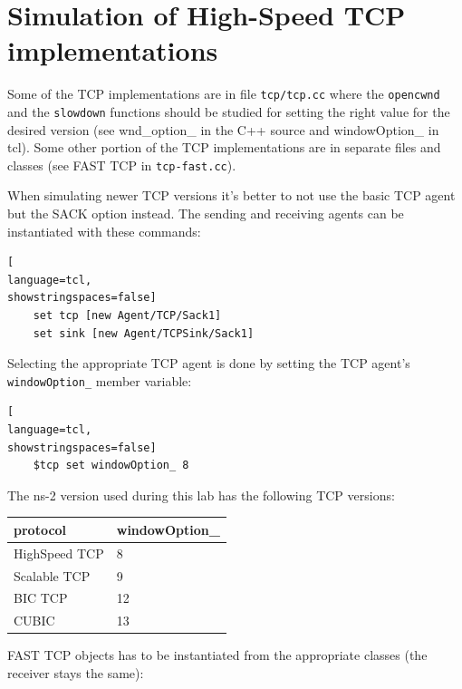 \documentclass[a4paper]{article}
\begin{document}
\section{Simulation of High-Speed TCP implementations}

Some of the TCP implementations are in file \verb!tcp/tcp.cc! where the \verb!opencwnd! and the
\verb!slowdown! functions should be studied for setting the right value for the desired version (see
wnd\_option\_ in the C++ source and windowOption\_ in tcl).
Some other portion of the TCP implementations are in separate files and classes (see FAST TCP in
\verb!tcp-fast.cc!).

When simulating newer TCP versions it's better to not use the basic TCP agent but the SACK option instead. The sending
and receiving agents can be instantiated with these commands:

\begin{lstlisting}[
language=tcl,
showstringspaces=false]
    set tcp [new Agent/TCP/Sack1]
    set sink [new Agent/TCPSink/Sack1]
\end{lstlisting}

Selecting the appropriate TCP agent is done by setting the TCP agent's \verb!windowOption_! member variable:

\begin{lstlisting}[
language=tcl,
showstringspaces=false]
    $tcp set windowOption_ 8
\end{lstlisting}

The ns-2 version used during this lab has the following TCP versions:

\begin{tabular}{|l|l|}
    \hline
    \cellcolor{blue!25} \textbf{protocol} & \cellcolor{blue!25} \textbf{windowOption\_}  \\\hline
    HighSpeed TCP                         & 8                                            \\\hline
    Scalable TCP                          & 9                                            \\\hline
    BIC TCP                               & 12                                           \\\hline
    CUBIC                                 & 13                                           \\\hline
\end{tabular}

\hfill \break
FAST TCP objects has to be instantiated from the appropriate classes (the receiver stays the same):
\end{document}

